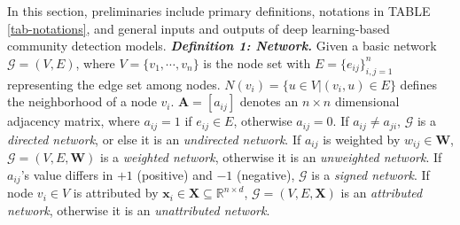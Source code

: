 \label{sec-preliminaries}
In this section, preliminaries include primary definitions, notations in TABLE \ref{tab-notations}, and general inputs and outputs of deep learning-based community detection models. 
\vspace{2mm}
\noindent
\textbf{\textit{Definition 1: Network.}} Given a basic network $\mathcal{G} = (V, E)$, where $V=\{v_{1}, \cdots, v_{n}\}$ is the node set with $E=\{e_{ij}\}_{i,j=1}^{n}$ representing the edge set among nodes. $N(v_i) = \{u\in V | (v_i, u)\in E\}$ defines the neighborhood of a node $v_i$. $\bm{A}=[a_{ij}]$ denotes an $n\times n$ dimensional adjacency matrix, where $a_{ij} = 1$ if $e_{ij}\in E$, otherwise $a_{ij} = 0$. If $a_{ij}\neq a_{ji}$, $\mathcal{G}$ is a \textit{directed network}, or else it is an \textit{undirected network}. If $a_{ij}$ is weighted by $w_{ij} \in \bm{W}$, $\mathcal{G} = (V,E,\bm{W})$ is a \textit{weighted network}, otherwise it is an \textit{unweighted network}. If $a_{ij}$'s value differs in $+1$ (positive) and $-1$ (negative), $\mathcal{G}$ is a \textit{signed network}. If node $v_i \in V$ is attributed by $\bm{x}_i \in \bm{X} \subseteq \mathbb{R}^{n\times d}$, $\mathcal{G} = (V,E,\bm{X})$ is an \textit{attributed network}, otherwise it is an \textit{unattributed network}. 
